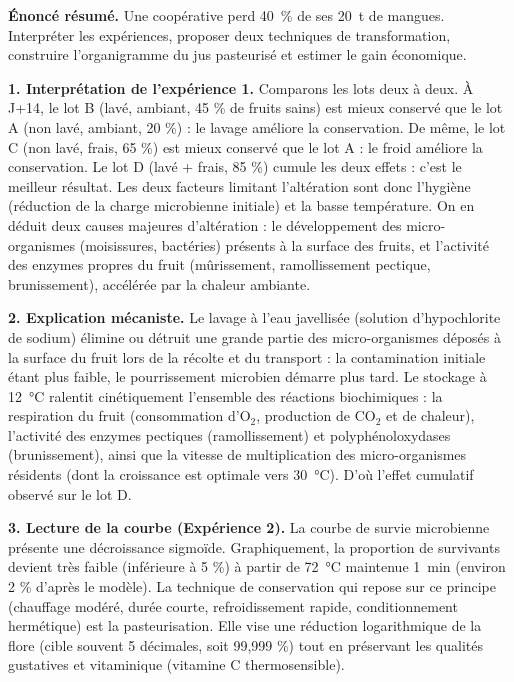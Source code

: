 \documentclass[11pt]{article}
\newcommand{\cle}[1]{{\popxbold\color{popdark}#1}}
\begin{document}
\begin{exoresolu}
\textbf{Énoncé résumé.} Une coopérative perd \SI{40}{\%} de ses \SI{20}{t} de mangues. Interpréter les expériences, proposer deux techniques de transformation, construire l'organigramme du jus pasteurisé et estimer le gain économique.

\tcblower

\textbf{1. Interprétation de l'expérience 1.} Comparons les lots deux à deux. À J+14, le lot B (lavé, ambiant, 45 \% de fruits sains) est mieux conservé que le lot A (non lavé, ambiant, 20 \%) : le \cle{lavage} améliore la conservation. De même, le lot C (non lavé, frais, 65 \%) est mieux conservé que le lot A : le \cle{froid} améliore la conservation. Le lot D (lavé + frais, 85 \%) cumule les deux effets : c'est le meilleur résultat. Les deux facteurs limitant l'altération sont donc l'hygiène (réduction de la charge microbienne initiale) et la basse température. On en déduit deux causes majeures d'altération : le développement des \cle{micro-organismes} (moisissures, bactéries) présents à la surface des fruits, et l'activité des \cle{enzymes} propres du fruit (mûrissement, ramollissement pectique, brunissement), accélérée par la chaleur ambiante.

\textbf{2. Explication mécaniste.} Le lavage à l'eau javellisée (solution d'hypochlorite de sodium) élimine ou détruit une grande partie des micro-organismes déposés à la surface du fruit lors de la récolte et du transport : la contamination initiale étant plus faible, le pourrissement microbien démarre plus tard. Le stockage à \SI{12}{\celsius} ralentit cinétiquement l'ensemble des réactions biochimiques : la respiration du fruit (consommation d'O$_2$, production de CO$_2$ et de chaleur), l'activité des enzymes pectiques (ramollissement) et polyphénoloxydases (brunissement), ainsi que la vitesse de multiplication des micro-organismes résidents (dont la croissance est optimale vers \SI{30}{\celsius}). D'où l'effet cumulatif observé sur le lot D.

\textbf{3. Lecture de la courbe (Expérience 2).} La courbe de survie microbienne présente une décroissance sigmoïde. Graphiquement, la proportion de survivants devient très faible (inférieure à 5 \%) à partir de \SI{72}{\celsius} maintenue \SI{1}{min} (environ 2 \% d'après le modèle). La technique de conservation qui repose sur ce principe (chauffage modéré, durée courte, refroidissement rapide, conditionnement hermétique) est la \cle{pasteurisation}. Elle vise une réduction logarithmique de la flore (cible souvent 5 décimales, soit 99,999 \%) tout en préservant les qualités gustatives et vitaminique (vitamine C thermosensible).


\end{exoresolu}
\end{document}
